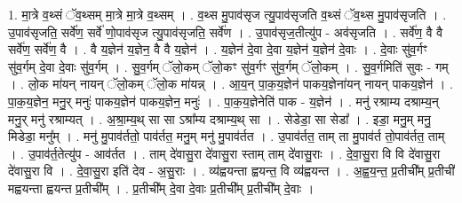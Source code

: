 \documentclass[17pt]{extarticle}
\begin{document}
1. मा॒त्रे व॒थ्सं ॅव॒थ्सम् मा॒त्रे मा॒त्रे व॒थ्सम् । . व॒थ्स मु॒पाव॑सृज त्यु॒पाव॑सृजति व॒थ्सं ॅव॒थ्स मु॒पाव॑सृजति । . उ॒पाव॑सृजति॒ सर्वे॑ण॒ सर्वे॑ णो॒पाव॑सृज त्यु॒पाव॑सृजति॒ सर्वे॑ण । . उ॒पाव॑सृज॒तीत्यु॑प - अव॑सृजति । . सर्वे॑ण॒ वै वै सर्वे॑ण॒ सर्वे॑ण॒ वै । . वै य॒ज्ञेन॑ य॒ज्ञेन॒ वै वै य॒ज्ञेन॑ । . य॒ज्ञेन॑ दे॒वा दे॒वा य॒ज्ञेन॑ य॒ज्ञेन॑ दे॒वाः । . दे॒वाः सु॑व॒र्गꣳ सु॑व॒र्गम् दे॒वा दे॒वाः सु॑व॒र्गम् । . सु॒व॒र्गम् ॅलो॒कम् ॅलो॒कꣳ सु॑व॒र्गꣳ सु॑व॒र्गम् ॅलो॒कम् । . सु॒व॒र्गमिति॑ सुवः - गम् । . लो॒क मा॑यन् नायन् ॅलो॒कम् ॅलो॒क मा॑यन्न् । . आ॒य॒न् पा॒क॒य॒ज्ञेन॑ पाकय॒ज्ञेना॑यन् नायन् पाकय॒ज्ञेन॑ । . पा॒क॒य॒ज्ञेन॒ मनु॒र् मनुः॑ पाकय॒ज्ञेन॑ पाकय॒ज्ञेन॒ मनुः॑ । . पा॒क॒य॒ज्ञेनेति॑ पाक - य॒ज्ञेन॑ । . मनु॑ रश्राम्य दश्राम्य॒न् मनु॒र् मनु॑ रश्राम्यत् । . अ॒श्रा॒म्य॒थ् सा सा ऽश्रा᳚म्य दश्राम्य॒थ् सा । . सेडेडा॒ सा सेडा᳚ । . इडा॒ मनु॒म् मनु॒ मिडेडा॒ मनु᳚म् । . मनु॑ मु॒पाव॑र्ततो॒ पाव॑र्तत॒ मनु॒म् मनु॑ मु॒पाव॑र्तत । . उ॒पाव॑र्तत॒ ताम् ता मु॒पाव॑र्त तो॒पाव॑र्तत॒ ताम् । . उ॒पाव॑र्त॒तेत्यु॑प - आव॑र्तत । . ताम् दे॑वासु॒रा दे॑वासु॒रा स्ताम् ताम् दे॑वासु॒राः । . दे॒वा॒सु॒रा वि वि दे॑वासु॒रा दे॑वासु॒रा वि । . दे॒वा॒सु॒रा इति॑ देव - अ॒सु॒राः । . व्य॑ह्वयन्ता ह्वयन्त॒ वि व्य॑ह्वयन्त । . अ॒ह्व॒य॒न्त॒ प्र॒तीची᳚म् प्र॒तीची॑ मह्वयन्ता ह्वयन्त प्र॒तीची᳚म् । . प्र॒तीची᳚म् दे॒वा दे॒वाः प्र॒तीची᳚म् प्र॒तीची᳚म् दे॒वाः । \newline
\end{document}
